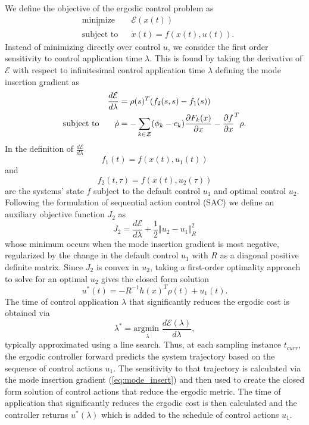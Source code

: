 \documentclass[letterpaper, 10 pt,  conference, twoside]{IEEEtran/IEEEtran}
\theoremstyle{definition}
\begin{document}
We define the objective of the ergodic control problem as
\begin{equation*}
\begin{aligned}
& \underset{u}{\text{minimize}}
& & \mathcal{E}(x(t)) \\
& \text{subject to}
& & \dot{x}(t) = f(x(t), u(t)) .
\end{aligned}
\end{equation*}
Instead of minimizing directly over control $u$, we consider the first order sensitivity to control application time $\lambda$. This is found by taking the derivative of $\mathcal{E}$ with respect to infinitesimal control application time $\lambda$ defining the mode insertion gradient as
\begin{equation} \label{eq:mode_insert}
\begin{aligned}
& & \frac{d \mathcal{E}}{d\lambda} &= \rho (s) ^T (f_2(s,s) - f_1(s)) \\
\text{subject to}
& & \dot{\bold{\rho}} &= - \sum_{k \in \mathcal{Z}}(\phi_k - c_k) \frac{\partial F_k(x)}{\partial x} - \frac{\partial f}{\partial x }^T \rho .
\end{aligned}
\end{equation}
In the definition of $ \frac{d \mathcal{E}}{d\lambda}$
\begin{equation*}
f_1(t) = f(x(t), u_1 (t))
\end{equation*}
and
\begin{equation*}
f_2(t, \tau) = f(x(t), u_2 (\tau))
\end{equation*}
are the systems' state $f$ subject to the default control $u_1$ and optimal control $u_2$. Following the formulation of sequential action control (SAC) \cite{ansari2016sequential} we define an auxiliary objective function $J_2$ as
\begin{equation*}
J_2 = \frac{d \mathcal{E}}{d \lambda} + \frac{1}{2}\Vert u_2 - u_1 \Vert_R^2
\end{equation*}
whose minimum occurs when the mode insertion gradient is most negative, regularized by the change in the default control $u_1$ with $R$ as a diagonal positive definite matrix. Since $J_2$ is convex in $u_2$, taking a first-order optimality approach to solve for an optimal $u_2$ gives the closed form solution
\begin{equation}
u^*(t) = -R^{-1}h(x)^T\rho(t) + u_1(t).
\end{equation} The time of control application $\lambda$ that significantly reduces the ergodic cost is obtained via
\begin{equation}
\lambda ^*= \underset{\lambda}{\text{argmin }} \frac{d\mathcal{E} (\lambda)}{d\lambda} ,
\end{equation}
typically approximated using a line search.
Thus, at each sampling instance $t_{curr}$, the ergodic controller forward predicts the system trajectory based on the sequence of control actions $u_1$. The sensitivity to that trajectory is calculated via the mode insertion gradient (\ref{eq:mode_insert}) and then  used to create the closed form solution of control actions that reduce the ergodic metric. The time of application that significantly reduces the ergodic cost is then calculated and the controller returns $u^*(\lambda)$ which is added to the schedule of control actions $u_1$.
\end{document}
